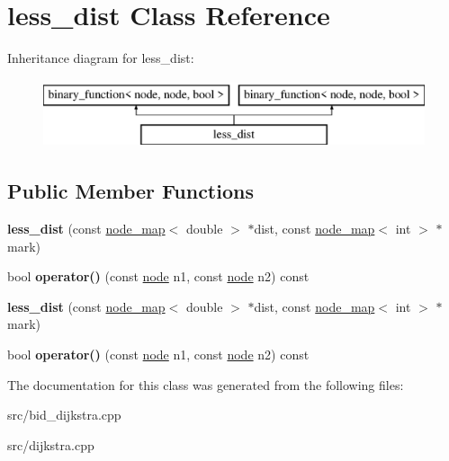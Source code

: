 \hypertarget{classless__dist}{}\section{less\+\_\+dist Class Reference}
\label{classless__dist}
Inheritance diagram for less\+\_\+dist\+:\begin{figure}[H]
\begin{center}
\leavevmode
\includegraphics[height=2.000000cm]{classless__dist}
\end{center}
\end{figure}
\subsection*{Public Member Functions}
\begin{DoxyCompactItemize}
\item 
\mbox{\label{classless__dist_a103396a9986a15a532b2e5eea09d5ac8}} 
{\bfseries less\+\_\+dist} (const \mbox{\hyperlink{classnode__map}{node\+\_\+map}}$<$ double $>$ $\ast$dist, const \mbox{\hyperlink{classnode__map}{node\+\_\+map}}$<$ int $>$ $\ast$mark)
\item 
\mbox{\label{classless__dist_ad60cec2a03ca609f0f4af0818ee9caeb}} 
bool {\bfseries operator()} (const \mbox{\hyperlink{classnode}{node}} n1, const \mbox{\hyperlink{classnode}{node}} n2) const
\item 
\mbox{\label{classless__dist_a103396a9986a15a532b2e5eea09d5ac8}} 
{\bfseries less\+\_\+dist} (const \mbox{\hyperlink{classnode__map}{node\+\_\+map}}$<$ double $>$ $\ast$dist, const \mbox{\hyperlink{classnode__map}{node\+\_\+map}}$<$ int $>$ $\ast$mark)
\item 
\mbox{\label{classless__dist_ad60cec2a03ca609f0f4af0818ee9caeb}} 
bool {\bfseries operator()} (const \mbox{\hyperlink{classnode}{node}} n1, const \mbox{\hyperlink{classnode}{node}} n2) const
\end{DoxyCompactItemize}


The documentation for this class was generated from the following files\+:\begin{DoxyCompactItemize}
\item 
src/bid\+\_\+dijkstra.\+cpp\item 
src/dijkstra.\+cpp\end{DoxyCompactItemize}
